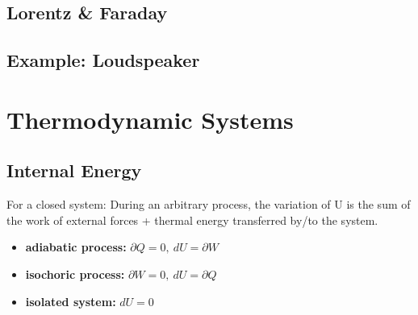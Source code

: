 \documentclass[10pt,a4paper]{scrartcl}
\begin{document}
\begin{multicols*}{3}
\subsection{Lorentz \& Faraday}




\vfill
\null
\columnbreak

\subsection{Example: Loudspeaker}








\vfill
\null
\columnbreak

\section{Thermodynamic Systems}

\subsection{Internal Energy}


For a closed system: During an arbitrary process, the variation of U is the sum of the work of external forces + thermal energy transferred by/to the system.

\begin{itemize}
\item \textbf{adiabatic process:} $\partial Q = 0,\ dU=\partial W$
\item \textbf{isochoric process:} $\partial W=0,\ dU=\partial Q$
\item \textbf{isolated system:} $dU=0$
\end{itemize}


\end{multicols*}
\end{document}
